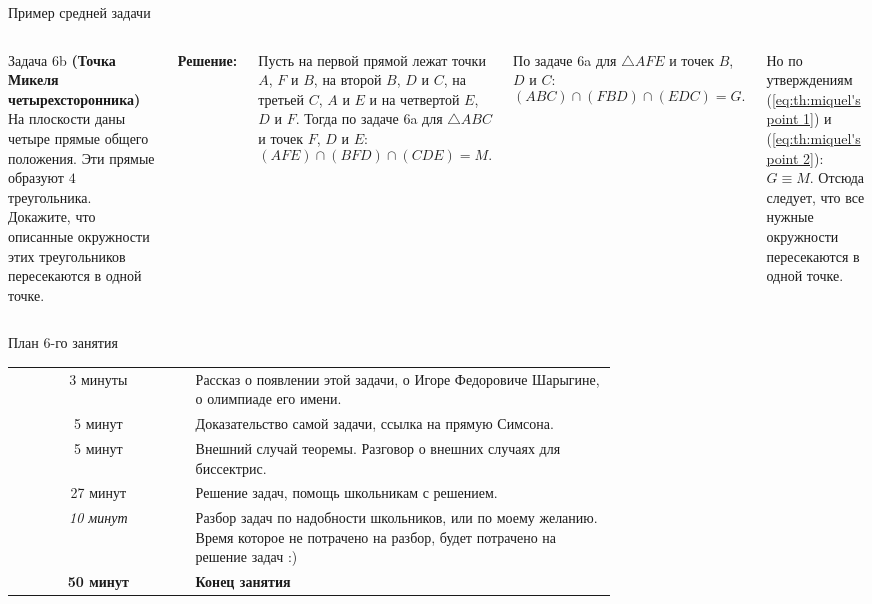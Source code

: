 \documentclass[12pt, aspectratio=169]{beamer}
\newcommand{\task}[2]{\textbf{(#1)} #2}
\begin{document}
\begin{frame}{Пример средней задачи}
    \begin{columns}
        \begin{block}{Задача 6b}
        \task{Точка Микеля четырехсторонника}{На плоскости даны четыре прямые общего положения. Эти прямые образуют $4$ треугольника. Докажите, что описанные окружности этих треугольников пересекаются в одной точке.} 
        \end{block}
        \textbf{Решение:}
        
        Пусть на первой прямой лежат точки $A$, $F$ и $B$, на второй $B$, $D$ и $C$, на третьей $C$, $A$ и $E$ и на четвертой $E$, $D$ и $F$. Тогда по задаче {\color{green!60!black}6a} для $\triangle ABC$ и точек $F$, $D$ и $E$:
        \begin{equation}
            (AFE) \cap (BFD) \cap (CDE) = M. \label{eq:th:miquel's point 1}
        \end{equation}

        По задаче {\color{green!60!black}6a} для $\triangle AFE$ и точек $B$, $D$ и $C$:
        \begin{equation}
            (ABC) \cap (FBD) \cap (EDC) = G. \label{eq:th:miquel's point 2}
        \end{equation}
        
        Но по утверждениям (\ref{eq:th:miquel's point 1}) и (\ref{eq:th:miquel's point 2}): $G \equiv M$. Отсюда следует, что все нужные окружности пересекаются в одной точке.
    \end{columns}
\end{frame}

\begin{frame}{План 6-го занятия}
    \centering
    \begin{tabular}{c | p{0.7\linewidth}}                
        3 минуты & Рассказ о появлении этой задачи, о Игоре Федоровиче Шарыгине, о олимпиаде его имени. \\ [3mm]

        5 минут & Доказательство самой задачи, ссылка на прямую Симсона. \\ [3mm]
        
        5 минут & Внешний случай теоремы. Разговор о внешних случаях для биссектрис. \\ [3mm]
        
        27 минут & Решение задач, помощь школьникам с решением.\\ [3mm]
        
        \textit{10 минут} & Разбор задач по надобности школьников, или по моему желанию. Время которое не потрачено на разбор, будет потрачено на решение задач :)\\ [3mm]
        
        \hline 
        \textbf{50 минут} & \textbf{Конец занятия}
    \end{tabular}
\end{frame}
\end{document}
